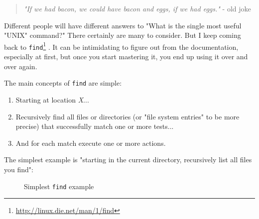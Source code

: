 \documentclass[10pt,american,]{book}
\makeatletter
\newenvironment{Shaded}{\begin{snugshade}}{\end{snugshade}}
\newcommand{\KeywordTok}[1]{\textcolor[rgb]{0.13,0.29,0.53}{\textbf{{#1}}}}
\newcommand{\NormalTok}[1]{{#1}}
\renewcommand{\href}[2]{#2\footnote{\url{#1}}}
\numberwithin{figure}{chapter}
\DeclareRobustCommand{\drcap}[1]{\begin{figure}[H]\caption{#1}\end{figure}}
\DeclareRobustCommand{\drcmd}[1]{\index{commands!#1@\texttt{#1}}}
\renewcommand{\KeywordTok}[1]{{#1}}
\renewcommand{\NormalTok}[1]{{#1}}
\makeatother
\begin{document}
\begin{quote}
\emph{"If we had bacon, we could have bacon and eggs, if we had eggs."}
- old joke
\end{quote}

Different people will have different answers to "What is the single most
useful "UNIX" command?" There certainly are many to consider. But I keep
coming back to
\href{http://linux.die.net/man/1/find}{\texttt{find}}\drcmd{find}
. It can be
intimidating to figure out from the documentation, especially at first,
but once you start mastering it, you end up using it over and over
again.

The main concepts of \texttt{find} are simple:

\begin{enumerate}
\def\labelenumi{\arabic{enumi}.}
\item
  Starting at location \emph{X}...
\item
  Recursively find all files or directories (or "file system entries" to
  be more precise) that successfully match one or more tests...
\item
  And for each match execute one or more actions.
\end{enumerate}

The simplest example is "starting in the current directory, recursively
list all files you find":

\drcap{Simplest \texttt{find} example}

\begin{Shaded}
\end{Shaded}
\end{document}
